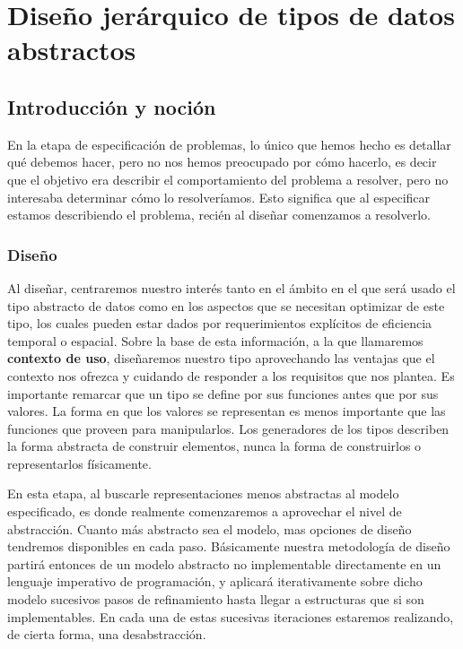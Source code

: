 \chapter{Dise\~no jer\'arquico de tipos de datos abstractos}

\section{Introducci\'on y noci\'on}

En la etapa de especificaci\'on de problemas, lo \'unico que hemos hecho es detallar qu\'e debemos hacer, pero no nos hemos preocupado por c\'omo hacerlo, es decir que el objetivo era describir el comportamiento del problema a resolver, pero no interesaba determinar c\'omo lo resolver\'iamos. Esto significa que al especificar estamos describiendo el problema, reci\'en al dise\~nar comenzamos a resolverlo.

\subsection{Dise\~no}

Al dise\~nar, centraremos nuestro inter\'es tanto en el \'ambito en el que ser\'a usado el tipo abstracto de datos como en los aspectos que se necesitan optimizar de este tipo, los cuales pueden estar dados por requerimientos expl\'icitos de eficiencia temporal o espacial. Sobre la base de esta informaci\'on, a la que llamaremos \textbf{contexto de uso}, dise\~naremos nuestro tipo aprovechando las ventajas que el contexto nos ofrezca y cuidando de responder a los requisitos que nos plantea. Es importante remarcar que un tipo se define por sus funciones antes que por sus valores. La forma en que los valores se representan es menos importante que las funciones que proveen para manipularlos. Los generadores de los tipos describen la forma abstracta de construir elementos, nunca la forma de construirlos o representarlos f\'isicamente.

En esta etapa, al buscarle representaciones menos abstractas al modelo especificado, es donde realmente comenzaremos a aprovechar el nivel de abstracci\'on. Cuanto m\'as abstracto sea el modelo, mas opciones de dise\~no tendremos disponibles en cada paso. B\'asicamente nuestra metodolog\'ia de dise\~no partir\'a entonces de un modelo abstracto no implementable directamente en un lenguaje imperativo de programaci\'on, y aplicar\'a iterativamente sobre dicho modelo sucesivos pasos de refinamiento hasta llegar a estructuras que si son implementables. En cada una de estas sucesivas iteraciones estaremos realizando, de cierta forma, una desabstracci\'on.

